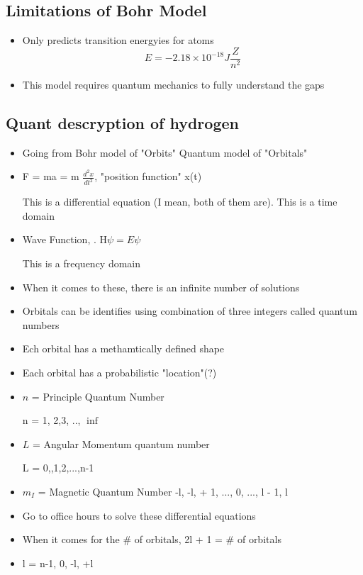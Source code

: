\documentclass{article}
\begin{document}
\subsection{Limitations of Bohr Model}
\begin{itemize}
  \item Only predicts transition energyies for atoms
    $$ E = -2.18\times{}10^{-18} J \frac{Z}{n^2} $$
  \item This model requires quantum mechanics to fully understand the gaps
\end{itemize}

\subsection{Quant descryption of hydrogen}
\begin{itemize}
  \item Going from Bohr model of "Orbits"
    \rightarrow{} Quantum model of "Orbitals"
  \item F = ma = m $\frac{d^2x}{dt^2}$, "position function" x(t)

    This is a differential equation (I mean, both of them are).
    This  is a time domain
  \item Wave Function, \Psi{}. H$\psi{} = E\psi{} $

    This is a frequency domain
  \item When it comes to these, there is an infinite number of solutions
  \item Orbitals can be identifies using combination of three integers called quantum numbers
  \item Ech orbital has a methamtically defined shape
  \item Each orbital has a probabilistic "location"(?)
  \item $n$ = Principle Quantum Number

    n = 1, 2,3, .., $\inf{}$
  \item $L$ = Angular Momentum quantum number

    L = 0,,1,2,...,n-1
  \item $m_I$ = Magnetic Quantum Number
    -l, -l, + 1, ..., 0, ..., l - 1, l
  \item Go to office hours to solve these differential equations
  \item When it comes for the \# of orbitals, 2l + 1 = \# of orbitals
  \item l = n-1, 0, -l, +l
\end{itemize}
\end{document}
